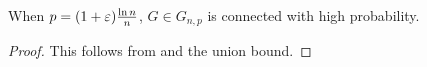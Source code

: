 \begin{thm}
  When $p = (1 + \varepsilon) \frac{\ln n}{n}$, $G \in G_{n, p}$ is
  connected with high probability.
\end{thm}
\begin{proof}
  This follows from  and the union bound.
\end{proof}
%



  




%

